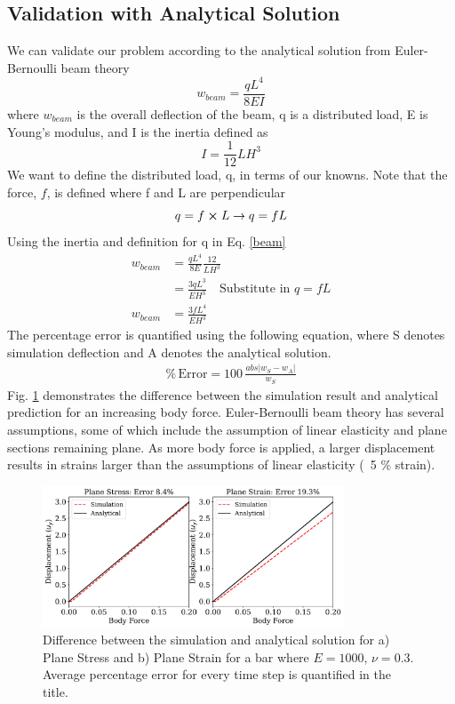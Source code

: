 \documentclass[12pt,3p]{article}
\begin{document}
\subsection{Validation with Analytical Solution}
We can validate our problem according to the analytical solution from Euler-Bernoulli beam theory 
\begin{equation}\label{beam}
w_{beam} = \frac{q L^4}{8 EI}
\end{equation}
where $w_{beam}$ is the overall deflection of the beam, q is a distributed load, E is Young's modulus, and I is the inertia defined as 
\begin{equation*}
I = \frac{1}{12} L H^3
\end{equation*}
We want to define the distributed load, q, in terms of our knowns. Note that the force, $f$, is defined where f and L are perpendicular
\begin{equation*}
q = f \cross L \rightarrow q = fL
\end{equation*}
Using the inertia and definition for q in Eq. \ref{beam}
\begin{align*}
w_{beam} &= \frac{q L^4}{8 E} \frac{12}{LH^3} \\
		&= \frac{3 q L^3}{E H^3} \quad \text{Substitute in } q=fL\\
w_{beam} &= \frac{3 f L^4}{E H^3}
\end{align*}
The percentage error is quantified using the following equation, where S denotes simulation deflection and A denotes the analytical solution. 
\begin{align*}
\% \, \text{Error} = 100 \, \frac{ abs |w_{S} - w_{A}| }{w_{S}}
\end{align*}
Fig. \ref{FigPlaneStrainStress} demonstrates the difference between the simulation result and analytical prediction for an increasing body force. Euler-Bernoulli beam theory has several assumptions, some of which include the assumption of linear elasticity and plane sections remaining plane. As more body force is applied, a larger displacement results in strains larger than the assumptions of linear elasticity (~5 \% strain).
\begin{figure}[!htb]
\centering
\includegraphics[width=0.8\textwidth]{./Images/PlaneStrainVsStress.pdf}
\caption{Difference between the simulation and analytical solution for a) Plane Stress and b) Plane Strain for a bar where $E = 1000, \, \nu = 0.3$. Average percentage error for every time step is quantified in the title.  }
\label{FigPlaneStrainStress}
\end{figure}
\end{document}
